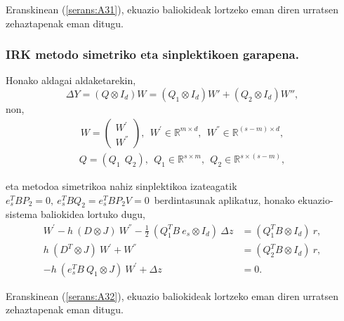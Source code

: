 Eranskinean (\ref{serans:A31}), ekuazio baliokideak lortzeko eman diren urratsen zehaztapenak eman ditugu. 


\subsubsection*{IRK metodo simetriko eta sinplektikoen garapena.}

Honako aldagai aldaketarekin,
\begin{equation*}
 \Delta Y = (Q \otimes I_d) W= (Q_1 \otimes I_d) W'+ (Q_2 \otimes I_d) W'',
\end{equation*}
non,
\begin{align*}
W=\left(
\begin{matrix}
W^{'} \\
W^{''} 
\end{matrix}
\right),\ \ W^{'} \in \mathbb{R}^{m \times d}, \ \ W^{''} \in \mathbb{R}^{(s-m) \times d},
\end{align*}
\begin{align*}
Q=(Q_1 \ \ Q_2), \ \  Q_1 \in \mathbb{R}^{s \times m}, \ \ Q_2 \in \mathbb{R}^{s \times (s-m)},
\end{align*}

eta metodoa simetrikoa nahiz sinplektikoa izateagatik $e_s^TBP_2=0, \ e_s^TBQ_2=e_s^TBP_2V=0$~berdintasunak aplikatuz, honako ekuazio-sistema baliokidea lortuko dugu,
\begin{align*}
 W^{'}-h \ (D \otimes J) \ W^{''} -\frac{1}{2}\ (Q_1^T B \ e_s \otimes I_d) \ \Delta z &= (Q_1^T B \otimes I_d) \ r,\\
 h \ (D^T \otimes J) \ W^{'}+W^{''} &= (Q_2^T B \otimes I_d) \ r,\\
 - h \ (e_s^T B \ Q_1 \otimes J) \ W^{'} + \Delta z &=0. 
\end{align*}

Eranskinean (\ref{serans:A32}), ekuazio baliokideak lortzeko eman diren urratsen zehaztapenak eman ditugu.

